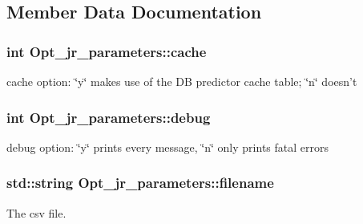 \subsection{Member Data Documentation}
\hypertarget{classOpt__jr__parameters_ad4061078141fd36321c49fa9105e11a5}{
\subsubsection[{cache}]{\setlength{\rightskip}{0pt plus 5cm}int Opt\-\_\-jr\-\_\-parameters\-::cache\hspace{0.3cm}{\ttfamily [private]}}}\label{classOpt__jr__parameters_ad4061078141fd36321c49fa9105e11a5}


cache option\-: \char`\"{}y\char`\"{} makes use of the D\-B predictor cache table; \char`\"{}n\char`\"{} doesn't 

\hypertarget{classOpt__jr__parameters_ae8241c7d0f75864365575e4be23037a3}{
\subsubsection[{debug}]{\setlength{\rightskip}{0pt plus 5cm}int Opt\-\_\-jr\-\_\-parameters\-::debug\hspace{0.3cm}{\ttfamily [private]}}}\label{classOpt__jr__parameters_ae8241c7d0f75864365575e4be23037a3}


debug option\-: \char`\"{}y\char`\"{} prints every message, \char`\"{}n\char`\"{} only prints fatal errors 

\hypertarget{classOpt__jr__parameters_aae2da456acbf5ac035faec6e01015714}{
\subsubsection[{filename}]{\setlength{\rightskip}{0pt plus 5cm}std\-::string Opt\-\_\-jr\-\_\-parameters\-::filename\hspace{0.3cm}{\ttfamily [private]}}}\label{classOpt__jr__parameters_aae2da456acbf5ac035faec6e01015714}


The csv file. 

